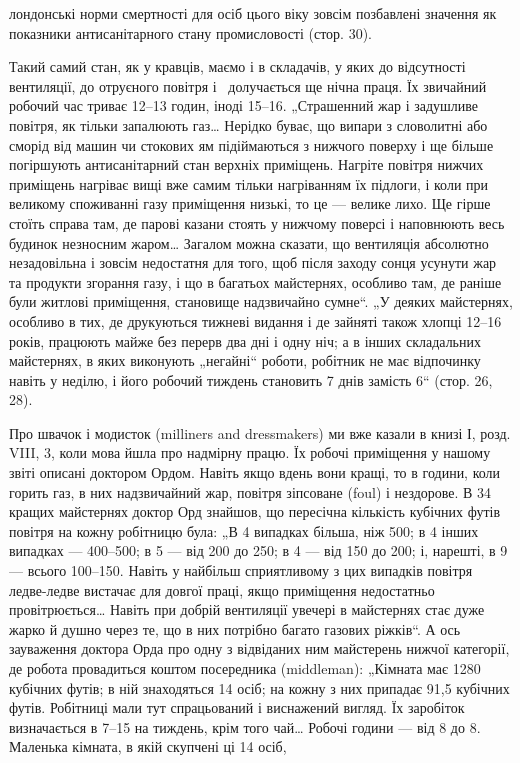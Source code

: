 \parcont{}  %
лондонські норми смертності для осіб цього віку зовсім позбавлені значення як показники
антисанітарного стану промисловості (стор. 30).

Такий самий стан, як у кравців, маємо і в складачів, у яких
до відсутності вентиляції, до отруєного повітря і~ долучається ще нічна праця. Їх звичайний
робочий час триває
12--13 годин, іноді 15--16. „Страшенний жар і задушливе повітря, як тільки запалюють газ\dots{} Нерідко
буває, що випари
з словолитні або сморід від машин чи стокових ям підіймаються
з нижчого поверху і ще більше погіршують антисанітарний стан
верхніх приміщень. Нагріте повітря нижчих приміщень нагріває
вищі вже самим тільки нагріванням їх підлоги, і коли при великому споживанні газу приміщення низькі,
то це — велике лихо.
Ще гірше стоїть справа там, де парові казани стоять у нижчому
поверсі і наповнюють весь будинок незносним жаром\dots{} Загалом можна сказати, що вентиляція абсолютно
незадовільна
і зовсім недостатня для того, щоб після заходу сонця усунути
жар та продукти згорання газу, і що в багатьох майстернях,
особливо там, де раніше були житлові приміщення, становище
надзвичайно сумне“. „У деяких майстернях, особливо в тих,
де друкуються тижневі видання і де зайняті також хлопці 12--16 років, працюють майже без перерв два
дні і одну ніч; а в інших складальних майстернях, в яких виконують „негайні“ роботи,
робітник не має відпочинку навіть у неділю, і його робочий
тиждень становить 7 днів замість 6“ (стор. 26, 28).

Про швачок і модисток (milliners and dressmakers) ми вже
казали в книзі І, розд. VIII, 3, коли мова йшла про
надмірну працю. Їх робочі приміщення у нашому звіті описані
доктором Ордом. Навіть якщо вдень вони кращі, то в години,
коли горить газ, в них надзвичайний жар, повітря зіпсоване (foul)
і нездорове. В 34 кращих майстернях доктор Орд знайшов, що
пересічна кількість кубічних футів повітря на кожну робітницю була: „В 4 випадках більша, ніж 500; в
4 інших випадках —
400--500; в 5 — від 200 до 250; в 4 — від 150 до 200; і, нарешті,
в 9 — всього 100--150. Навіть у найбільш сприятливому з цих
випадків повітря ледве-ледве вистачає для довгої праці, якщо
приміщення недостатньо провітрюється\dots{} Навіть при добрій вентиляції увечері в майстернях стає дуже
жарко й душно через
те, що в них потрібно багато газових ріжків“. А ось зауваження
доктора Орда про одну з відвіданих ним майстерень нижчої
категорії, де робота провадиться коштом посередника (middleman):
„Кімната має 1280 кубічних футів; в ній знаходяться
14 осіб; на кожну з них припадає 91,5 кубічних футів. Робітниці мали тут спрацьований і виснажений
вигляд. Їх заробіток
визначається в 7--15 на тиждень, крім того чай\dots{} Робочі
години — від 8 до 8. Маленька кімната, в якій скупчені ці 14 осіб,
\parbreak{}  %
